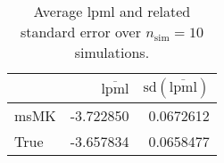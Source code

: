 \begin{table}[H]

\caption{Average lpml and related standard error over $n_{\text{sim}} = 10$ simulations.}
\centering
\begin{tabular}[t]{lrr}
\toprule
  & $\overbar{\text{lpml}}$ & $\text{sd}(\overbar{\text{lpml}})$\\
\midrule
msMK & -3.722850 & 0.0672612\\
True & -3.657834 & 0.0658477\\
\bottomrule
\end{tabular}
\end{table}